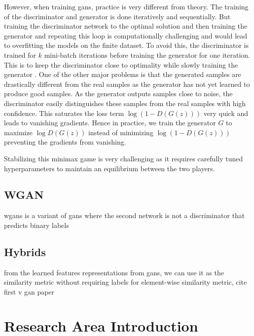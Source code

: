 However, when training \acp{gan}, practice is very different from theory. The training of the discriminator and generator is done iteratively and sequentially. But training the discriminator network to the optimal solution and then training the generator and repeating this loop is computationally challenging and would lead to overfitting the models on the finite dataset. To avoid this, the discriminator is trained for $k$ mini-batch iterations before training the generator for one iteration. This is to keep the discriminator close to optimality while slowly training the generator \cite{goodfellow2014generative}. One of the other major problems is that the generated samples are drastically different from the real samples as the generator has not yet learned to produce good samples. As the generator outputs samples close to noise, the discriminator easily distinguishes these samples from the real samples with high confidence. This saturates the loss term $\log (1-D(G(z)))$ very quick and leads to vanishing gradients. Hence in practice, we train the generator $G$ to maximize $\log D(G(z))$ instead of minimizing $\log (1-D(G(z)))$ preventing the gradients from vanishing.

Stabilizing this minimax game is very challenging as it requires carefully tuned hyperparameters to maintain an equilibrium between the two players.


\subsection{WGAN}
\acp{wgan} is a variant of \acp{gan} where the second network is not a discriminator that predicts binary labels

\subsection{Hybrids}

from the learned features representations from gans, we can use it as the similarity metric without requiring labels for element-wise similarity metric, cite first v gan paper \cite{autoencoding_beyond_pixels}

\lipsum[1-4] %

\section{Research Area Introduction}
\label{sec:Research area introduction}

